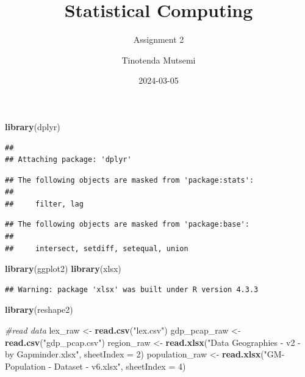 \documentclass[
]{article}
\title{Statistical Computing}
\subtitle{Assignment 2}
\author{Tinotenda Mutsemi}
\date{2024-03-05}
\newenvironment{Shaded}{\begin{snugshade}}{\end{snugshade}}
\newcommand{\AttributeTok}[1]{\textcolor[rgb]{0.13,0.29,0.53}{#1}}
\newcommand{\CommentTok}[1]{\textcolor[rgb]{0.56,0.35,0.01}{\textit{#1}}}
\newcommand{\DecValTok}[1]{\textcolor[rgb]{0.00,0.00,0.81}{#1}}
\newcommand{\FunctionTok}[1]{\textcolor[rgb]{0.13,0.29,0.53}{\textbf{#1}}}
\newcommand{\NormalTok}[1]{#1}
\newcommand{\OtherTok}[1]{\textcolor[rgb]{0.56,0.35,0.01}{#1}}
\newcommand{\StringTok}[1]{\textcolor[rgb]{0.31,0.60,0.02}{#1}}
\begin{document}
\maketitle

\begin{Shaded}
\begin{Highlighting}[]
\FunctionTok{library}\NormalTok{(dplyr)}
\end{Highlighting}
\end{Shaded}

\begin{verbatim}
## 
## Attaching package: 'dplyr'
\end{verbatim}

\begin{verbatim}
## The following objects are masked from 'package:stats':
## 
##     filter, lag
\end{verbatim}

\begin{verbatim}
## The following objects are masked from 'package:base':
## 
##     intersect, setdiff, setequal, union
\end{verbatim}

\begin{Shaded}
\begin{Highlighting}[]
\FunctionTok{library}\NormalTok{(ggplot2)}
\FunctionTok{library}\NormalTok{(xlsx)}
\end{Highlighting}
\end{Shaded}

\begin{verbatim}
## Warning: package 'xlsx' was built under R version 4.3.3
\end{verbatim}

\begin{Shaded}
\begin{Highlighting}[]
\FunctionTok{library}\NormalTok{(reshape2)}
\end{Highlighting}
\end{Shaded}

\begin{Shaded}
\begin{Highlighting}[]
\CommentTok{\#read data}
\NormalTok{lex\_raw }\OtherTok{\textless{}{-}} \FunctionTok{read.csv}\NormalTok{(}\StringTok{"lex.csv"}\NormalTok{)}
\NormalTok{gdp\_pcap\_raw }\OtherTok{\textless{}{-}} \FunctionTok{read.csv}\NormalTok{(}\StringTok{"gdp\_pcap.csv"}\NormalTok{)}
\NormalTok{region\_raw }\OtherTok{\textless{}{-}} \FunctionTok{read.xlsx}\NormalTok{(}\StringTok{"Data Geographies {-} v2 {-} by Gapminder.xlsx"}\NormalTok{, }\AttributeTok{sheetIndex =} \DecValTok{2}\NormalTok{)}
\NormalTok{population\_raw }\OtherTok{\textless{}{-}} \FunctionTok{read.xlsx}\NormalTok{(}\StringTok{"GM{-}Population {-} Dataset {-} v6.xlsx"}\NormalTok{, }\AttributeTok{sheetIndex =} \DecValTok{4}\NormalTok{)}
\end{Highlighting}
\end{Shaded}
\end{document}
